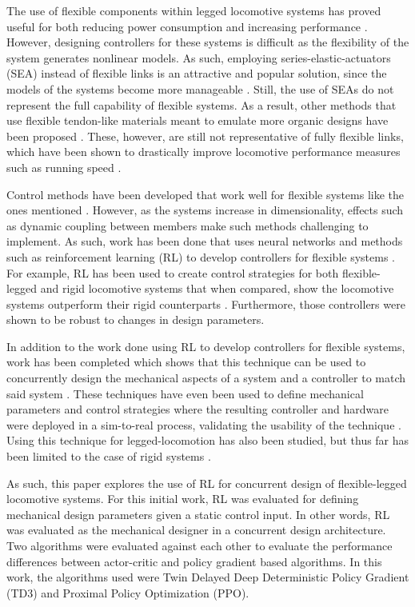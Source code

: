 \documentclass[10pt,twocolumn,letterpaper]{article}
\begin{document}
The use of flexible components within legged locomotive systems has proved useful for both reducing power consumption and increasing performance \cite{Sugiyama2004, Buondonno2017, Hurst2008}. However, designing controllers for these systems is difficult as the flexibility of the system generates nonlinear models. As such, employing series-elastic-actuators (SEA) instead of flexible links is an attractive and popular solution, since the models of the systems become more manageable \cite{Buondonno2017, Zhang2019, Pratt1995}. Still, the use of SEAs do not represent the full capability of flexible systems. As a result, other methods that use flexible tendon-like materials meant to emulate more organic designs have been proposed \cite{Iida2005}. These, however, are still not representative of fully flexible links, which have been shown to drastically improve locomotive performance measures such as running speed \cite{Saranli2001}.

Control methods have been developed that work well for flexible systems like the ones mentioned \cite{Luo1993, Modeling2003}. However, as the systems increase in dimensionality, effects such as dynamic coupling between members make such methods challenging to implement. As such, work has been done that uses neural networks and methods such as reinforcement learning (RL) to develop controllers for flexible systems \cite{Bhagat2019e, Thuruthelb}. For example, RL has been used to create control strategies for both flexible-legged and rigid locomotive systems that when compared, show the locomotive systems outperform their rigid counterparts \cite{Dwiel2019d}. Furthermore, those controllers were shown to be robust to changes in design parameters. 

In addition to the work done using RL to develop controllers for flexible systems, work has been completed which shows that this technique can be used to concurrently design the mechanical aspects of a system and a controller to match said system \cite{Ha2019j}. These techniques have even been used to define mechanical parameters and control strategies where the resulting controller and hardware were deployed in a sim-to-real process, validating the usability of the technique \cite{Chen2020}. Using this technique for legged-locomotion has also been studied, but thus far has been limited to the case of rigid systems \cite{Schaff2019e}. 

As such, this paper explores the use of RL for concurrent design of flexible-legged locomotive systems. For this initial work, RL was evaluated for defining mechanical design parameters given a static control input. In other words, RL was evaluated as the mechanical designer in a concurrent design architecture. Two algorithms were evaluated against each other to evaluate the performance differences between actor-critic and policy gradient based algorithms. In this work, the algorithms used were Twin Delayed Deep Deterministic Policy Gradient (TD3) and Proximal Policy Optimization (PPO). 
\end{document}
